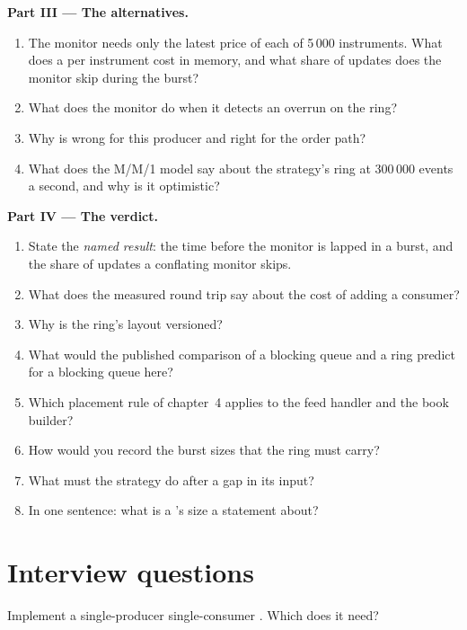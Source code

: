 \begin{problem}
\medskip\noindent\textbf{Part III --- The alternatives.}
\begin{enumerate}[resume]
\item The monitor needs only the latest price of each of 5\,000 instruments. What does a  per instrument cost in memory,
and what share of updates does the monitor skip during the burst?
\item What does the monitor do when it detects an overrun on the ring?
\item Why is  wrong for this producer and right for the order path?
\item What does the M/M/1 model say about the strategy's ring at 300\,000 events a second, and why is it optimistic?
\end{enumerate}

\medskip\noindent\textbf{Part IV --- The verdict.}
\begin{enumerate}[resume]
\item State the \emph{named result}: the time before the monitor is lapped in a burst, and the share of updates a conflating monitor
skips.
\item What does the measured round trip say about the cost of adding a consumer?
\item Why is the ring's layout versioned?
\item What would the published comparison of a blocking queue and a ring predict for a blocking queue here?
\item Which placement rule of chapter~4 applies to the feed handler and the book builder?
\item How would you record the burst sizes that the ring must carry?
\item What must the strategy do after a gap in its input?
\item In one sentence: what is a 's size a statement about?
\end{enumerate}
\end{problem}

\section{Interview questions}

\begin{interviewq}\label{iq:ll:queues-ring-buffers-and-shared-memory:1}
Implement a single-producer single-consumer . Which  does it need?
\end{interviewq}

